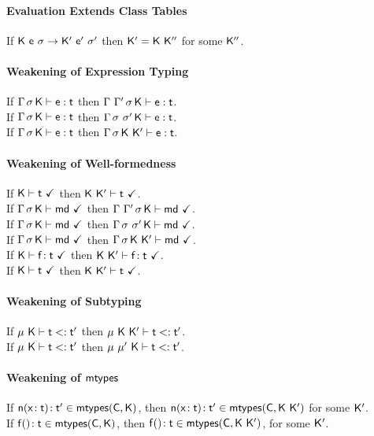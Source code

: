 \documentclass[a4paper,USenglish]{tex/lipics-v2016}
\begin{document}
\paragraph{Evaluation Extends Class Tables}

If ${{\sf{K}}}~{{\sf{e}}}~{\sigma} \rightarrow {{\ensuremath{{\sf{K'}}}}}~{{{{\sf{e'}}}}}~{{{\sigma'}}}$ then ${{\sf{K'}}} = {\sf{K}}~{{\sf{K''}}}$ for some ${{\sf{K''}}}$.

\paragraph{Weakening of Expression Typing}

If $\EnvType\Env\s\K\e\t$ then $\EnvType{\Env~\Envp}\s\K\e\t$. \\ 
If $\EnvType\Env\s\K\e\t$ then $\EnvType\Env{\s~\s'}\K\e\t$. \\ 
If $\EnvType\Env\s\K\e\t$ then $\EnvType\Env\s{\K~\Kp}\e\t$. \\ 

\paragraph{Weakening of Well-formedness}

If $\WFtype\K\t$ then $\WFtype{\K~\Kp}\t$. \\
If $\Gamma\,\sigma\,{\sf{K}}\vdash{\sf{md}} ~\checkmark$ then $\Gamma~\Gamma'\,\sigma\,{\sf{K}}\vdash{\sf{md}} ~\checkmark$.\\
If $\Gamma\,\sigma\,{\sf{K}}\vdash{\sf{md}} ~\checkmark$ then $\Gamma\,\sigma~\sigma'\,{\sf{K}}\vdash{\sf{md}} ~\checkmark$.\\
If $\Gamma\,\sigma\,{\sf{K}}\vdash{\sf{md}} ~\checkmark$ then $\Gamma\,\sigma\,{\sf{K}}~{{\sf{K'}}}\vdash{\sf{md}} ~\checkmark$.\\
If $\WFtype\K{\Fdef\f\t}$ then $\WFtype{\K~\Kp}{\Fdef\f\t}$.\\
If $\WFtype\K\t$ then $\WFtype{\K~\Kp}\t$.\\

\paragraph{Weakening of Subtyping}

If $\StrSub\M{\K}\t\tp$ then $\StrSub\M{\K~\Kp}\t\tp$. \\
If $\StrSub{\M}{\K}\t\tp$ then $\StrSub{\M~\M'}{\K}\t\tp$.

\paragraph{Weakening of ${\sf{mtypes}}$}

If $\Mtype\n{\HT\x\t}\tp \in \classoff{\C}{\K}$, then $\Mtype\n{\HT\x\t}\tp \in \classoff{\C}{\K~\Kp}$ for some ${{\sf{K'}}}$.\\
If $\Mtype\f{}\t \in \classoff\C\K$, then $\Mtype\f{}\t \in \classoff\C{\K~\Kp}$, for some ${{\sf{K'}}}$.
\end{document}
